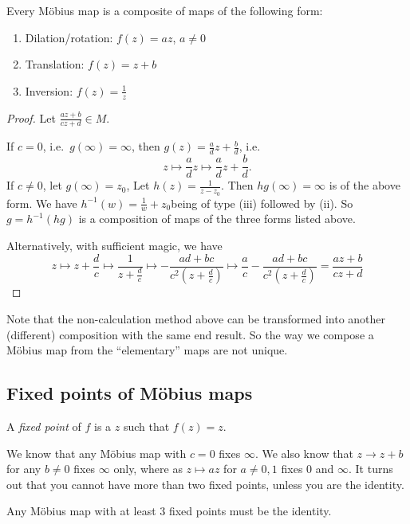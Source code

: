 \documentclass[a4paper]{article}
\begin{document}
\begin{prop}
  Every M\"obius map is a composite of maps of the following form:
  \begin{enumerate}
    \item Dilation/rotation: $f(z) = az$, $a\not= 0$
    \item Translation: $f(z) = z + b$
    \item Inversion: $f(z) = \frac{1}{z}$
  \end{enumerate}
\end{prop}
\begin{proof}
  Let $\frac{az + b}{cz + d}\in M$.

  If $c = 0$, i.e.\ $g(\infty) = \infty$, then $g(z) = \frac{a}{d}z + \frac{b}{d}$, i.e.
  \[
    z\mapsto \frac{a}{d} z\mapsto \frac{a}{d}z + \frac{b}{d}.
  \]
  If $c\not= 0$, let $g(\infty)=z_0$, Let $h(z) = \frac{1}{z - z_0}$. Then $hg(\infty) = \infty$ is of the above form. We have $h^{-1}(w) = \frac{1}{w} + z_0$being of type (iii) followed by (ii). So $g = h^{-1} (hg)$ is a composition of maps of the three forms listed above.

  Alternatively, with sufficient magic, we have
  \[
    z\mapsto z + \frac{d}{c} \mapsto \frac{1}{z + \frac{d}{c}} \mapsto -\frac{ad + bc}{c^2(z + \frac{d}{c})}\mapsto \frac{a}{c} -\frac{ad + bc}{c^2(z + \frac{d}{c})} = \frac{az + b}{cz + d}
  \]
\end{proof}
Note that the non-calculation method above can be transformed into another (different) composition with the same end result. So the way we compose a M\"obius map from the ``elementary'' maps are not unique.

\subsection{Fixed points of M\texorpdfstring{\"o}{o}bius maps}
\begin{defi}
  A \emph{fixed point} of $f$ is a $z$ such that $f(z) = z$.
\end{defi}

We know that any M\"obius map with $c = 0$ fixes $\infty$. We also know that $z\to z + b$ for any $b\not= 0$ fixes $\infty$ only, where as $z\mapsto az$ for $a\not= 0, 1$ fixes $0$ and $\infty$. It turns out that you cannot have more than two fixed points, unless you are the identity.

\begin{prop}
  Any M\"obius map with at least 3 fixed points must be the identity.
\end{prop}
\end{document}

